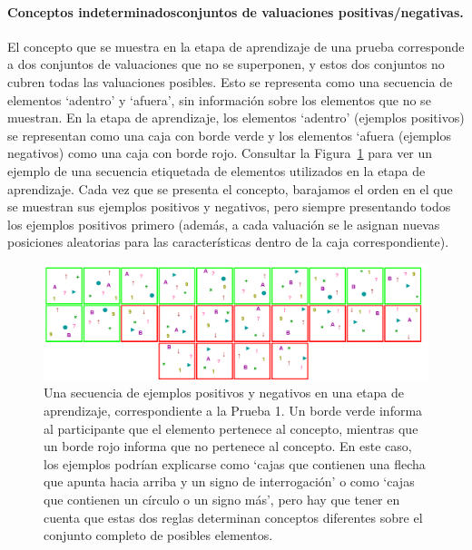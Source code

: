 \paragraph{Conceptos indeterminados\textemdash conjuntos de valuaciones positivas/negativas.} \label{IncompleteConcepts} El concepto que se muestra en la etapa de aprendizaje de una prueba corresponde a dos conjuntos de valuaciones que no se superponen, y estos dos conjuntos no cubren todas las valuaciones posibles. Esto se representa como una secuencia de elementos `adentro' y `afuera', sin información sobre los elementos que no se muestran. En la etapa de aprendizaje, los elementos `adentro' (ejemplos positivos) se representan como una caja con borde verde y los elementos `afuera (ejemplos negativos) como una caja con borde rojo. Consultar la Figura~\ref{Figure:training} para ver un ejemplo de una secuencia etiquetada de elementos utilizados en la etapa de aprendizaje. Cada vez que se presenta el concepto, barajamos el orden en el que se muestran sus ejemplos positivos y negativos, pero siempre presentando todos los ejemplos positivos primero (además, a cada valuación se le asignan nuevas posiciones aleatorias para las características dentro de la caja correspondiente).

\begin{figure}[h!] 
\begin{center}
    \includegraphics[scale=0.35]{papers/images_behavior_research_methods/Learning.PNG}
	\caption{
	Una secuencia de ejemplos positivos y negativos en una etapa de aprendizaje, correspondiente a la Prueba 1. Un borde verde informa al participante que el elemento pertenece al concepto, mientras que un borde rojo informa que no pertenece al concepto. En este caso, los ejemplos podrían explicarse como `cajas que contienen una flecha que apunta hacia arriba y un signo de interrogación' o como `cajas que contienen un círculo o un signo más', pero hay que tener en cuenta que estas dos reglas determinan conceptos diferentes sobre el conjunto completo de posibles elementos.}
	\label{Figure:training}
\end{center}
\end{figure}

